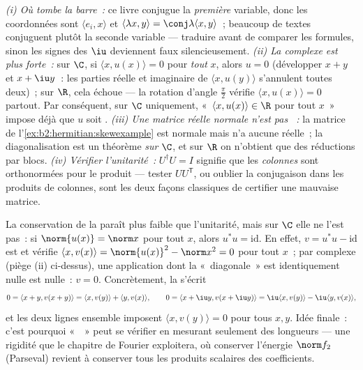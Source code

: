 \begin{remark}
\emph{(i) Où tombe la barre~:} ce livre conjugue la
\emph{première} variable, donc les coordonnées sont $\langle e_i,
x\rangle$ et $\langle\lambda x, y\rangle = \conj\lambda\langle x,
y\rangle$~; beaucoup de textes conjuguent plutôt la seconde variable
--- traduire avant de comparer les formules, sinon les signes des
$\iu$ deviennent faux silencieusement. \emph{(ii) La 
complexe est plus forte~:} sur $\C$, si $\langle x, u(x)\rangle = 0$
pour \emph{tout} $x$, alors $u = 0$ (développer $x + y$ et $x + \iu
y$~: les parties réelle et imaginaire de $\langle x, u(y)\rangle$
s'annulent toutes deux)~; sur $\R$, cela échoue --- la rotation
d'angle $\frac\pi2$ vérifie $\langle x, u(x)\rangle = 0$ partout. Par
conséquent, sur $\C$ uniquement, «~$\langle x, u(x)\rangle \in \R$
pour tout $x$~» impose déjà que $u$ soit . \emph{(iii) Une
matrice réelle normale n'est pas ~:} la matrice de
l'\cref{ex:b2:hermitian:skewexample} est normale mais n'a aucune
 réelle~; la diagonalisation  est un théorème
\emph{sur} $\C$, et sur $\R$ on n'obtient que des réductions par
blocs. \emph{(iv) Vérifier l'unitarité~:} $U^\dagger U = I$ signifie
que les \emph{colonnes} sont orthonormées pour le produit 
--- tester $UU^{\mathsf T}$, ou oublier la conjugaison dans les
produits de colonnes, sont les deux façons classiques de certifier
une mauvaise matrice.
\end{remark}

\begin{example}\label{ex:b2:hermitian:isometry}
La conservation de la  paraît plus faible que l'unitarité, mais
sur $\C$ elle ne l'est pas~: si $\norm{u(x)} = \norm x$ pour tout
$x$, alors $u^*u = \mathrm{id}$. En effet, $v = u^*u - \mathrm{id}$
est  et vérifie $\langle x, v(x)\rangle = \norm{u(x)}^2 -
\norm x^2 = 0$ pour tout $x$~; par  complexe (piège (ii)
ci-dessus), une application dont la «~diagonale~» est identiquement
nulle est nulle~: $v = 0$. Concrètement, la  s'écrit
\[
0 = \langle x + y, v(x+y)\rangle
= \langle x, v(y)\rangle + \langle y, v(x)\rangle,
\qquad
0 = \langle x + \iu y, v(x + \iu y)\rangle
= \iu\langle x, v(y)\rangle - \iu\langle y, v(x)\rangle ,
\]
et les deux lignes ensemble imposent $\langle x, v(y)\rangle = 0$
pour tous $x, y$. Idée finale~: c'est pourquoi «~~» peut se
vérifier en mesurant seulement des longueurs --- une rigidité que le
chapitre de Fourier exploitera, où conserver l'énergie
$\norm f_2$ (Parseval) revient à conserver tous les produits
scalaires des coefficients.
\end{example}

